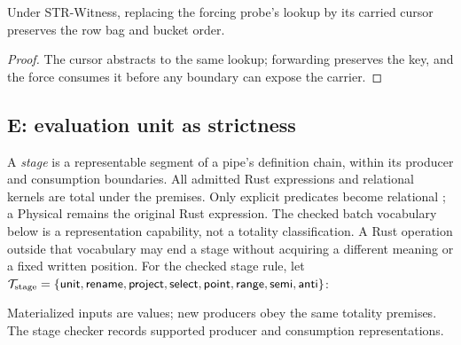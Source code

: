 \begin{lemma}
Under STR-Witness, replacing the forcing probe's lookup by its carried
cursor preserves the row bag and bucket order.
\end{lemma}
\begin{proof}
The cursor abstracts to the same lookup; forwarding preserves the key,
and the force consumes it before any boundary can expose the carrier.
\end{proof}

\subsection{E: evaluation unit as strictness}
A \emph{stage} is a representable segment of a pipe's definition chain,
within its producer and consumption boundaries. All admitted Rust expressions
and relational kernels are total under the premises. Only explicit
 predicates become relational ; a Physical
 remains the original Rust expression.
The checked batch vocabulary below is a representation capability, not a
totality classification. A Rust operation outside that vocabulary may end a
stage without acquiring a different meaning or a fixed written position.
For the checked stage rule, let
$\mathcal T_{\rm stage}=\{\mathsf{unit},\mathsf{rename},\mathsf{project},
\mathsf{select},\mathsf{point},\mathsf{range},\mathsf{semi},\mathsf{anti}\}$:
\begin{mathpar}
\end{mathpar}
Materialized inputs are values; new producers obey the same totality premises.
The stage checker records supported producer and consumption representations.

